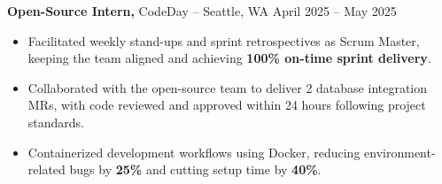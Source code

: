 \documentclass[11pt]{article}
\begin{document}
\textbf{Open-Source Intern,} {CodeDay} -- Seattle, WA \hfill April 2025 -- May 2025
\vspace{-9pt}
\begin{itemize}
  \item Facilitated weekly stand-ups and sprint retrospectives as Scrum Master, keeping the team aligned and achieving \textbf{100\% on-time sprint delivery}.
  \item Collaborated with the open-source team to deliver 2 database integration MRs, with code reviewed and approved within 24 hours following project standards.
  \item Containerized development workflows using Docker, reducing environment-related bugs by \textbf{25\%} and cutting setup time by \textbf{40\%}.
\end{itemize}

\end{document}
